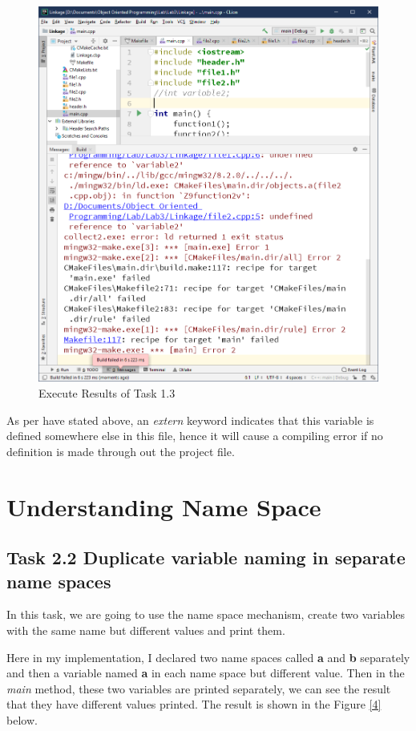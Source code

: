 \documentclass[a4paper]{report}
\begin{document}
\begin{figure}
  \centering
  \includegraphics[scale=0.5]{Onethree.PNG}
  \caption{Execute Results of Task 1.3}\label{3}
\end{figure}


As per have stated above, an \emph{extern} keyword indicates that this variable is defined somewhere else in this file, hence it will cause a compiling error if no definition is made through out the project file.
\section{Understanding Name Space}
\subsection{Task 2.2 Duplicate variable naming in separate name spaces}
In this task, we are going to use the name space mechanism, create two variables with the same name but different values and print them.
\par
Here in my implementation, I declared two name spaces called \textbf{a} and \textbf{b} separately and then a variable named \textbf{a} in each name space but different value. Then in the \emph{main} method, these two variables are printed separately, we can see the result that they have different values printed. The result is shown in the Figure \ref{4} below.
\end{document}
